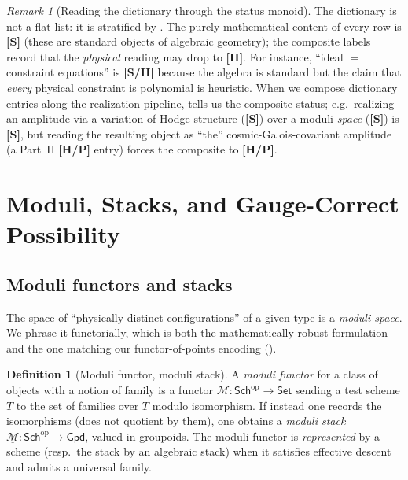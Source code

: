 \documentclass[12pt]{article}
\theoremstyle{definition}
\newtheorem{definition}[theorem]{Definition}
\theoremstyle{remark}
\newtheorem{remark}[theorem]{Remark}
\newcommand{\Sch}{\mathsf{Sch}}
\newcommand{\Set}{\mathsf{Set}}
\newcommand{\Grpd}{\mathsf{Gpd}}
\newcommand{\op}{\mathrm{op}}
\newcommand{\status}[1]{\textnormal{\textsf{\textbf{[#1]}}}}
\begin{document}
\begin{remark}[Reading the dictionary through the status monoid]
The dictionary is not a flat list: it is stratified by . The purely
mathematical content of every row is \status{S} (these are standard objects of algebraic geometry);
the composite labels record that the \emph{physical} reading may drop to \status{H}. For instance,
``ideal $=$ constraint equations'' is \status{S/H} because the algebra is standard but the claim that
\emph{every} physical constraint is polynomial is heuristic. When we compose dictionary entries along
the realization pipeline,  tells us the composite status; e.g.\ realizing an
amplitude via a variation of Hodge structure (\status{S}) over a moduli \emph{space} (\status{S}) is
\status{S}, but reading the resulting object as ``the'' cosmic-Galois-covariant amplitude (a Part~II
\status{H/P} entry) forces the composite to \status{H/P}.
\end{remark}

\section{Moduli, Stacks, and Gauge-Correct Possibility}
\label{sec:moduli}

\subsection{Moduli functors and stacks}

The space of ``physically distinct configurations'' of a given type is a \emph{moduli space}. We phrase
it functorially, which is both the mathematically robust formulation and the one matching our
functor-of-points encoding ().

\begin{definition}[Moduli functor, moduli stack]
\label{def:moduli}
A \emph{moduli functor} for a class of objects with a notion of family is a functor
$\mathcal M\colon \Sch^{\op}\to\Set$ sending a test scheme $T$ to the set of families over $T$ modulo
isomorphism. If instead one records the isomorphisms (does not quotient by them), one obtains a
\emph{moduli stack} $\underline{\mathcal M}\colon \Sch^{\op}\to\Grpd$, valued in groupoids. The moduli
functor is \emph{represented} by a scheme (resp.\ the stack by an algebraic stack) when it satisfies
effective descent and admits a universal family.
\end{definition}
\end{document}
